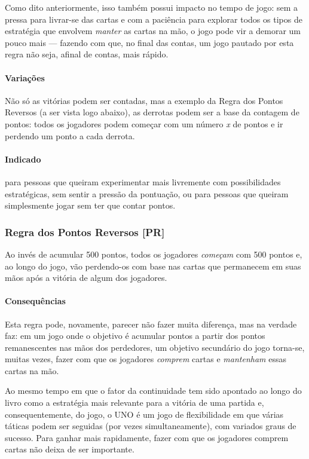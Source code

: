 Como dito anteriormente, isso também possui impacto no tempo de jogo: sem a pressa para livrar-se das cartas e com a paciência para explorar todos os tipos de estratégia que envolvem \textit{manter} as cartas na mão, o jogo pode vir a demorar um pouco mais --- fazendo com que, no final das contas, um jogo pautado por esta regra não seja, afinal de contas, mais rápido.

\paragraph{Variações}

Não só as vitórias podem ser contadas, mas a exemplo da Regra dos Pontos Reversos (a ser vista logo abaixo), as derrotas podem ser a base da contagem de pontos: todos os jogadores podem começar com um número \emph{x} de pontos e ir perdendo um ponto a cada derrota. 

\paragraph{Indicado}

para pessoas que queiram experimentar mais livremente com possibilidades estratégicas, sem sentir a pressão da pontuação, ou para pessoas que queiram simplesmente jogar sem ter que contar pontos.

\subsubsection{Regra dos Pontos Reversos [PR]}

\label{pontosreversos}

Ao invés de acumular 500 pontos, todos os jogadores \textit{começam} com 500 pontos e, ao longo do jogo, vão perdendo-os com base nas cartas que permanecem em suas mãos após a vitória de algum dos jogadores.

\paragraph{Consequências}

Esta regra pode, novamente, parecer não fazer muita diferença, mas na verdade faz: em um jogo onde o objetivo é acumular pontos a partir dos pontos remanescentes nas mãos dos perdedores, um objetivo secundário do jogo torna-se, muitas vezes, fazer com que os jogadores \textit{comprem} cartas e \textit{mantenham} essas cartas na mão.

Ao mesmo tempo em que o fator da continuidade tem sido apontado ao longo do livro como a estratégia mais relevante para a vitória de uma partida e, consequentemente, do jogo, o UNO é um jogo de flexibilidade em que várias táticas podem ser seguidas (por vezes simultaneamente), com variados graus de sucesso. Para ganhar mais rapidamente, fazer com que os jogadores comprem cartas não deixa de ser importante.

